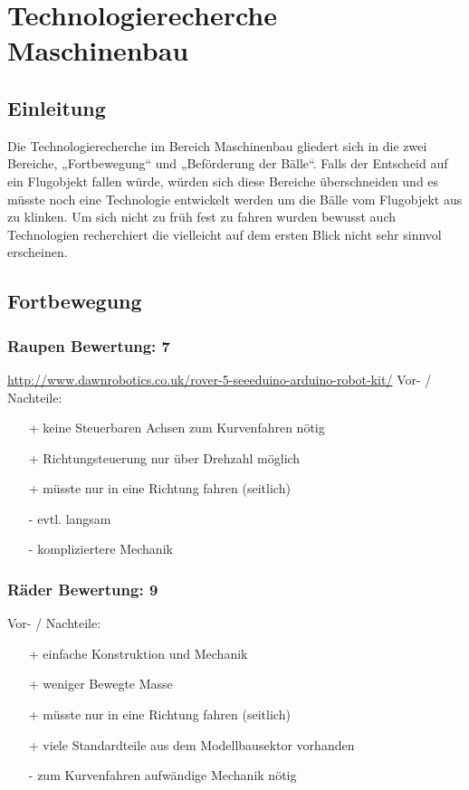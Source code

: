 \section{Technologierecherche Maschinenbau}

\subsection{Einleitung}
Die Technologierecherche im Bereich Maschinenbau gliedert sich in die zwei 
Bereiche, „Fortbewegung“ und  „Beförderung der Bälle“. Falls der Entscheid auf ein Flugobjekt fallen würde, würden sich diese Bereiche überschneiden und es müsste noch eine Technologie entwickelt werden um die Bälle vom Flugobjekt aus zu klinken. Um sich nicht zu früh fest zu fahren wurden bewusst auch Technologien recherchiert die vielleicht auf dem ersten Blick nicht sehr sinnvol erscheinen.

\subsection{Fortbewegung}

\subsubsection{Raupen \hfill Bewertung: 7}
\url{http://www.dawnrobotics.co.uk/rover-5-seeeduino-arduino-robot-kit/}
Vor- / Nachteile:
\begin{itemize}
    \item[+] keine Steuerbaren Achsen zum Kurvenfahren nötig 
    \item[+] Richtungsteuerung nur über Drehzahl möglich
    \item[+] müsste nur in eine Richtung fahren (seitlich)
    \item[-] evtl. langsam
    \item[-] kompliziertere Mechanik
\end{itemize}

\subsubsection{Räder \hfill Bewertung: 9}
Vor- / Nachteile:
\begin{itemize}
    \item[+] einfache Konstruktion und Mechanik
    \item[+] weniger Bewegte Masse
    \item[+] müsste nur in eine Richtung fahren (seitlich)
    \item[+] viele Standardteile aus dem Modellbausektor vorhanden
    \item[-] zum Kurvenfahren aufwändige Mechanik nötig
\end{itemize}

